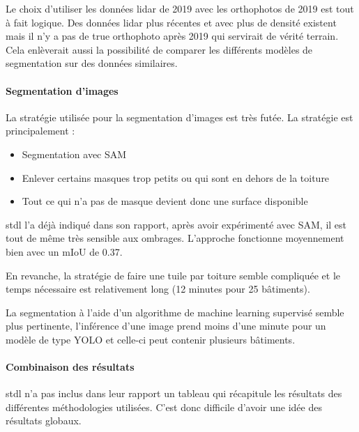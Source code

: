 \par{Le choix d'utiliser les données \gls{lidar} de 2019 avec les orthophotos de 2019 est tout à fait logique. Des données \gls{lidar} plus récentes et avec plus de densité existent mais il n'y a pas de true orthophoto après 2019 qui servirait de vérité terrain. Cela enlèverait aussi la possibilité de comparer les différents modèles de segmentation sur des données similaires.}

\paragraph{Segmentation d'images}

\par{La stratégie utilisée pour la segmentation d'images est très futée. La stratégie est principalement :}
\begin{itemize}
    \item Segmentation avec SAM
    \item Enlever certains masques trop petits ou qui sont en dehors de la toiture
    \item Tout ce qui n'a pas de masque devient donc une surface disponible
\end{itemize}

\par{\acrshort{stdl} l'a déjà indiqué dans son rapport, après avoir expérimenté avec SAM, il est tout de même très sensible aux ombrages. L'approche fonctionne moyennement bien avec un mIoU de 0.37.}

\par{En revanche, la stratégie de faire une tuile par toiture semble compliquée et le temps nécessaire est relativement long (12 minutes pour 25 bâtiments).}

\par{La segmentation à l'aide d'un algorithme de machine learning supervisé semble plus pertinente, l'inférence d'une image prend moins d'une minute pour un modèle de type YOLO et celle-ci peut contenir plusieurs bâtiments.}

\paragraph{Combinaison des résultats}

\par{\acrshort{stdl} n'a pas inclus dans leur rapport un tableau qui récapitule les résultats des différentes méthodologies utilisées. C'est donc difficile d'avoir une idée des résultats globaux.}

